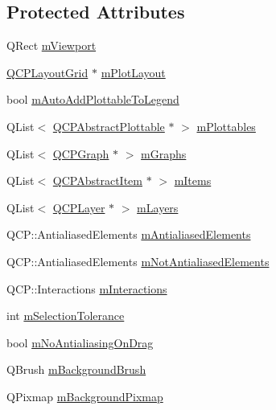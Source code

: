 \subsection*{Protected Attributes}
\begin{DoxyCompactItemize}
\item 
Q\+Rect \hyperlink{class_q_custom_plot_ac0a7c38a715526c257cff95774f83ab6}{m\+Viewport}
\item 
\hyperlink{class_q_c_p_layout_grid}{Q\+C\+P\+Layout\+Grid} $\ast$ \hyperlink{class_q_custom_plot_ac97298756882a0eecd98151679850ac1}{m\+Plot\+Layout}
\item 
bool \hyperlink{class_q_custom_plot_aaf3ea6a4cb04d35a149cc9a0cdac3394}{m\+Auto\+Add\+Plottable\+To\+Legend}
\item 
Q\+List$<$ \hyperlink{class_q_c_p_abstract_plottable}{Q\+C\+P\+Abstract\+Plottable} $\ast$ $>$ \hyperlink{class_q_custom_plot_a4b6c694fbdb2f201626f71eff2d1694e}{m\+Plottables}
\item 
Q\+List$<$ \hyperlink{class_q_c_p_graph}{Q\+C\+P\+Graph} $\ast$ $>$ \hyperlink{class_q_custom_plot_a38676b141ac8005fca4882a73ddfaf59}{m\+Graphs}
\item 
Q\+List$<$ \hyperlink{class_q_c_p_abstract_item}{Q\+C\+P\+Abstract\+Item} $\ast$ $>$ \hyperlink{class_q_custom_plot_afa5fd6957169dfef2e4e7815a04c36e0}{m\+Items}
\item 
Q\+List$<$ \hyperlink{class_q_c_p_layer}{Q\+C\+P\+Layer} $\ast$ $>$ \hyperlink{class_q_custom_plot_a9685e7ec1ef5e6066dd7d91bb3a698b3}{m\+Layers}
\item 
Q\+C\+P\+::\+Antialiased\+Elements \hyperlink{class_q_custom_plot_aa333200629256830e273873b582a5524}{m\+Antialiased\+Elements}
\item 
Q\+C\+P\+::\+Antialiased\+Elements \hyperlink{class_q_custom_plot_a2b6ebcad00a90ba07f146cefcd4293da}{m\+Not\+Antialiased\+Elements}
\item 
Q\+C\+P\+::\+Interactions \hyperlink{class_q_custom_plot_ad717377ceba7493b4b32f0bcbbdf1895}{m\+Interactions}
\item 
int \hyperlink{class_q_custom_plot_abc36e12dd0482117ad810a800c847722}{m\+Selection\+Tolerance}
\item 
bool \hyperlink{class_q_custom_plot_ac83df968435f6b8ec79f2993ab9124e8}{m\+No\+Antialiasing\+On\+Drag}
\item 
Q\+Brush \hyperlink{class_q_custom_plot_a3aef5de4ac012178e3293248e9c63737}{m\+Background\+Brush}
\item 
Q\+Pixmap \hyperlink{class_q_custom_plot_ae8f4677399324a78c5f8dbfb95a34f90}{m\+Background\+Pixmap}

\end{DoxyCompactItemize}
